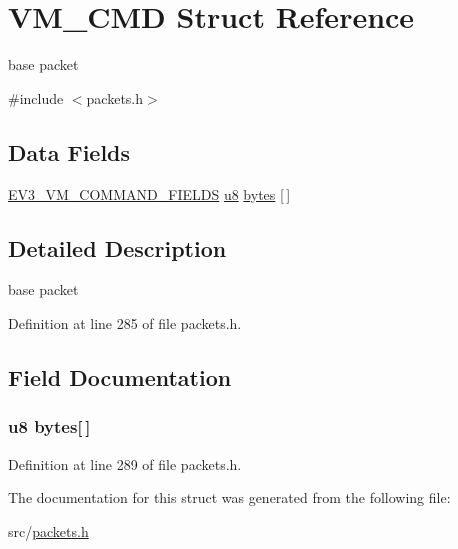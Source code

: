 \hypertarget{struct_v_m___c_m_d}{}\section{V\+M\+\_\+\+C\+M\+D Struct Reference}
\label{struct_v_m___c_m_d}


base packet  




{\ttfamily \#include $<$packets.\+h$>$}

\subsection*{Data Fields}
\begin{DoxyCompactItemize}
\item 
\hyperlink{packets_8h_a4c98eb40db8c22149f549465d1186e0d}{E\+V3\+\_\+\+V\+M\+\_\+\+C\+O\+M\+M\+A\+N\+D\+\_\+\+F\+I\+E\+L\+D\+S} \hyperlink{defs_8h_a92c50087ca0e64fa93fc59402c55f8ca}{u8} \hyperlink{struct_v_m___c_m_d_a8e19d282af2481cb27f08a7de26a8e6a}{bytes} \mbox{[}$\,$\mbox{]}
\end{DoxyCompactItemize}


\subsection{Detailed Description}
base packet 

Definition at line 285 of file packets.\+h.



\subsection{Field Documentation}
\hypertarget{struct_v_m___c_m_d_a8e19d282af2481cb27f08a7de26a8e6a}{}
\subsubsection[{bytes}]{ {\bf u8} bytes\mbox{[}$\,$\mbox{]}}\label{struct_v_m___c_m_d_a8e19d282af2481cb27f08a7de26a8e6a}


Definition at line 289 of file packets.\+h.



The documentation for this struct was generated from the following file\+:\begin{DoxyCompactItemize}
\item 
src/\hyperlink{packets_8h}{packets.\+h}\end{DoxyCompactItemize}
